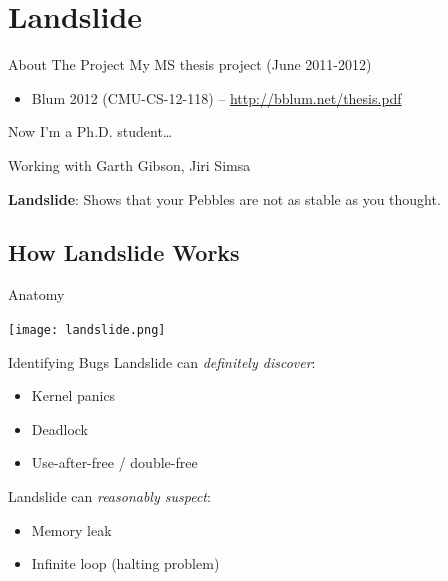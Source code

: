 \documentclass[xcolor=dvipsnames]{beamer}
\begin{document}
{\section{Landslide}


\begin{frame}{About The Project}
	My MS thesis project (June 2011-2012)
	\begin{itemize}
		\item Blum 2012 (CMU-CS-12-118) -- \url{http://bblum.net/thesis.pdf}
	\end{itemize}

	\linegap
	Now I'm a Ph.D. student\dots

	\linegap
	Working with Garth Gibson, Jiri Simsa

	\linegap
	{\bf Landslide}: Shows that your Pebbles are not as stable as you thought.
\end{frame}


\subsection{How Landslide Works}

\begin{frame}{Anatomy}
	\begin{center}
	\texttt{[image: landslide.png]}
	\end{center}
\end{frame}

\begin{frame}{Identifying Bugs}
	Landslide can {\em definitely discover}:
	\begin{itemize}
		\item Kernel panics %
		\item Deadlock
		\item Use-after-free / double-free
	\end{itemize}
	\linegap
	Landslide can {\em reasonably suspect}:
	\begin{itemize}
		\item Memory leak
		\item Infinite loop (halting problem)
	\end{itemize}
\end{frame}

}
\end{document}
